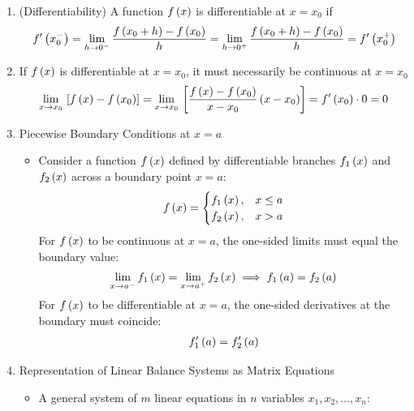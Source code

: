\begin{enumerate}[label=\thesubsection.\arabic*, ref=\thesubsection.\theenumi,itemsep=0pt]
\begin{align}
\lim_{x \to x_0^-} f\brak{x} = \lim_{x \to x_0^+} f\brak{x} = f\brak{x_0} \label{eq:EE26BTECH11213-continuity_cond}
\end{align}
\item (Differentiability) 
A function $f\left(x\right)$ is differentiable at $x = x_0$ if
\begin{align}
f'\left(x_0^-\right) = \lim_{h \to 0^-} \frac{f\left(x_0 + h\right) - f\left(x_0\right)}{h} = \lim_{h \to 0^+} \frac{f\left(x_0 + h\right) - f\left(x_0\right)}{h} = f'\left(x_0^+\right) 
\label{eq:EE26BTECH11213-deriv_equality}
\end{align}
\item 
If $f\left(x\right)$ is differentiable at $x = x_0$, it must necessarily be continuous at $x = x_0$
\begin{align}
\lim_{x \to x_0} {}\left[f\left(x\right) - f\left(x_0\right)\right] = \lim_{x \to x_0} {}\left[\frac{f\left(x\right) - f\left(x_0\right)}{x - x_0} \left(x - x_0\right)\right] = f'\left(x_0\right) \cdot 0 = 0 \label{eq:EE26BTECH11213-diff_implies_cont}
\end{align}
%
\item Piecewise Boundary Conditions at $x = a$
\begin{itemize}
\item Consider a function $f\left(x\right)$ defined by differentiable branches $f_1\left(x\right)$ and $f_2\left(x\right)$ across a boundary point $x = a$:
\begin{align}
f\left(x\right) = \begin{cases}
f_1\left(x\right), & x \le a \\
f_2\left(x\right), & x > a
\end{cases} \label{eq:EE26BTECH11213-piecewise_branches}
\end{align}
For $f\left(x\right)$ to be continuous at $x = a$, the one-sided limits must equal the boundary value:
\begin{align}
\lim_{x \to a^-} f_1\left(x\right) = \lim_{x \to a^+} f_2\left(x\right) \implies f_1\left(a\right) = f_2\left(a\right) \label{eq:EE26BTECH11213-piecewise_cont_cond}
\end{align}
For $f\left(x\right)$ to be differentiable at $x = a$, the one-sided derivatives at the boundary must coincide:
\begin{align}
f_1'\left(a\right) = f_2'\left(a\right) \label{eq:EE26BTECH11213-piecewise_diff_cond}
\end{align}
\end{itemize}
\iffalse
\item Representation of Linear Balance Systems as Matrix Equations
\begin{itemize}
\item A general system of $m$ linear equations in $n$ variables $x_1, x_2, \dots, x_n$:

\end{itemize}
\end{enumerate}
